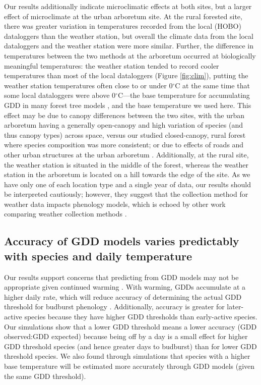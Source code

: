 \documentclass{article}\usepackage[]{graphicx}\usepackage[]{color}
\begin{document}
Our results additionally indicate microclimatic effects at both sites, but a larger effect of microclimate at the urban arboretum site. At the rural forested site, there was greater variation in temperatures recorded from the local (HOBO) dataloggers than the weather station, but overall the climate data from the local dataloggers and the weather station were more similar. Further, the difference in temperatures between the two methods at the arboretum occurred at biologically meaningful temperatures: the weather station tended to record cooler temperatures than most of the local dataloggers (Figure \ref{fig:clim}), putting the weather station temperatures often close to or under 0$^{\circ}$C at the same time that some local dataloggers were above 0$^{\circ}$C---the base temperature for accumulating GDD in many forest tree models \citep{Man2010}, and the base temperature we used here. This effect may be due to canopy differences between the two sites, with the urban arboretum having a generally open-canopy and high variation of species (and thus canopy types) across space, versus our studied closed-canopy, rural forest where species composition was more consistent; or due to effects of roads and other urban structures at the urban arboretum \citep{Stabler2005,Erell2012,Dimoudi2013}. Additionally, at the rural site, the weather station is situated in the middle of the forest, whereas the weather station in the arboretum is located on a hill towards the edge of the site. As we have only one of each location type and a single year of data, our results should be interpreted cautiously; however, they suggest that the collection method for weather data impacts phenology models, which is echoed by other work comparing weather collection methods \citep[e.g.,][]{Laigle2021}.

\subsection{Accuracy of GDD models varies predictably with species and daily temperature} 
Our results support concerns that predicting from GDD models may not be appropriate given continued warming \citep{Man2010}. With warming, GDDs accumulate at a higher daily rate, which will reduce accuracy of determining the actual GDD threshold for budburst phenology \citep{Bonhomme2000}. Additionally, accuracy is greater for later-active species because they have higher GDD thresholds than early-active species. Our simulations show that a lower GDD threshold means a lower accuracy (GDD observed:GDD expected) because being off by a day is a small effect for higher GDD threshold species (and hence greater days to budburst) than for lower GDD threshold species. We also found through simulations that species with a higher base temperature will be estimated more accurately through GDD models (given the same GDD threshold). 
\end{document}
